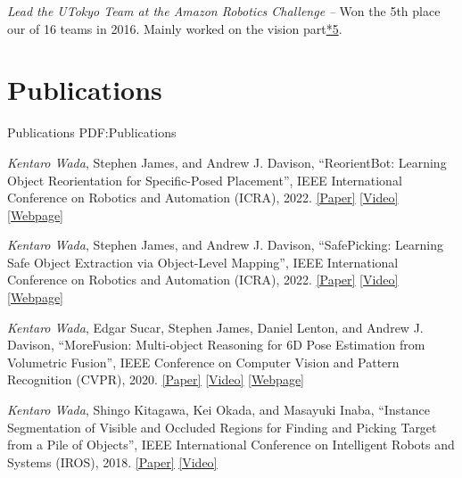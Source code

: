 \documentclass[letterpaper,MMMyyyy,nonstop]{simpleresumecv}
\begin{document}
\begin{body}
\BigGapNoBreak

\textit{Lead the UTokyo Team at the Amazon Robotics Challenge}
\hfill
{\it {} -- }
\newline
Won the 5th place our of 16 teams in 2016. Mainly worked on the vision part\href{https://github.com/start-jsk/jsk_apc}{*5}.




\section
{Publications}
{Publications}
{PDF:Publications}

\BulletItem
\textit{Kentaro Wada}, Stephen James, and Andrew J. Davison,
``ReorientBot: Learning Object Reorientation for Specific-Posed Placement'',
IEEE International Conference on Robotics and Automation (ICRA), 2022.
\href{https://arxiv.org/abs/2202.11092}{\underline{[Paper]}}
\href{https://youtu.be/ahWN84sWWJU}{\underline{[Video]}}
\href{https://reorientbot.wkentaro.com}{\underline{[Webpage]}}

\BulletItem
\textit{Kentaro Wada}, Stephen James, and Andrew J. Davison,
``SafePicking: Learning Safe Object Extraction via Object-Level Mapping'',
IEEE International Conference on Robotics and Automation (ICRA), 2022.
\href{https://arxiv.org/abs/2202.05832}{\underline{[Paper]}}
\href{https://youtu.be/ejjqiBqRRKo}{\underline{[Video]}}
\href{https://safepicking.wkentaro.com}{\underline{[Webpage]}}

\BulletItem
\textit{Kentaro Wada}, Edgar Sucar, Stephen James, Daniel Lenton, and Andrew J.
Davison,
``MoreFusion: Multi-object Reasoning for 6D Pose Estimation from Volumetric
Fusion'',
IEEE Conference on Computer Vision and Pattern Recognition (CVPR), 2020.
\href{https://arxiv.org/abs/2004.04336}{\underline{[Paper]}}
\href{https://youtu.be/6oLUhuZL4ko}{\underline{[Video]}}
\href{https://morefusion.wkentaro.com}{\underline{[Webpage]}}

\BulletItem
\textit{Kentaro Wada}, Shingo Kitagawa, Kei Okada, and Masayuki Inaba,
``Instance Segmentation of Visible and Occluded Regions for Finding and Picking Target from a Pile of Objects'',
IEEE International Conference on Intelligent Robots and Systems (IROS), 2018.
\href{https://arxiv.org/abs/2001.07475}{\underline{[Paper]}}
\href{https://youtu.be/tNLtXb04i3w}{\underline{[Video]}}


\end{body}
\end{document}
